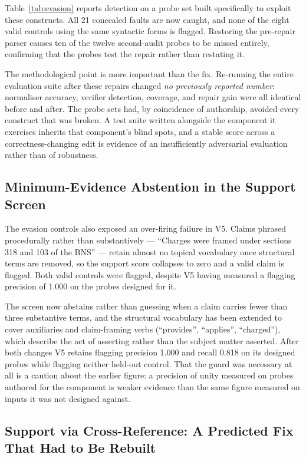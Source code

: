 \documentclass[conference]{IEEEtran}
\begin{document}
Table~\ref{tab:evasion} reports detection on a probe set built specifically to
exploit these constructs. All 21 concealed faults are now caught, and none of
the eight valid controls using the same syntactic forms is flagged. Restoring the
pre-repair parser causes ten of the twelve second-audit probes to be missed
entirely, confirming that the probes test the repair rather than restating it.

The methodological point is more important than the fix. Re-running the entire
evaluation suite after these repairs changed \emph{no previously reported
number}: normaliser accuracy, verifier detection, coverage, and repair gain
were all identical before and after. The probe sets had, by coincidence of
authorship, avoided every construct that was broken. A test suite written
alongside the component it exercises inherits that component's blind spots, and
a stable score across a correctness-changing edit is evidence of an
insufficiently adversarial evaluation rather than of robustness.

\subsection{Minimum-Evidence Abstention in the Support Screen}
\label{ssec:minev}

The evasion controls also exposed an over-firing failure in V5. Claims phrased
procedurally rather than substantively --- ``Charges were framed under sections
318 and 103 of the BNS'' --- retain almost no topical vocabulary once
structural terms are removed, so the support score collapses to zero and a
valid claim is flagged. Both valid controls were flagged, despite V5 having
measured a flagging precision of 1.000 on the probes designed for it.

The screen now abstains rather than guessing when a claim carries fewer than
three substantive terms, and the structural vocabulary has been extended to
cover auxiliaries and claim-framing verbs (``provides'', ``applies'',
``charged''), which describe the act of asserting rather than the subject
matter asserted. After both changes V5 retains flagging precision 1.000 and
recall 0.818 on its designed probes while flagging neither held-out control.
That the guard was necessary at all is a caution about the earlier figure: a
precision of unity measured on probes authored for the component is weaker
evidence than the same figure measured on inputs it was not designed against.

\subsection{Support via Cross-Reference: A Predicted Fix That Had to Be Rebuilt}
\label{ssec:xrefsupport}
\end{document}
